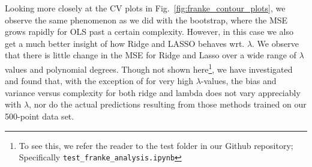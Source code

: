 \documentclass[reprint, english, nofootinbib]{revtex4-2}
\begin{document}
Looking more closely at the CV plots in Fig.~\ref{fig:franke_contour_plots}, we observe the same phenomenon as we did with the bootstrap, where the MSE grows rapidly for OLS past a certain complexity. However, in this case we also get a much better insight of how Ridge and LASSO behaves wrt. $\lambda$. We observe that there is little change in the MSE for Ridge and Lasso over a wide range of $\lambda$ values and polynomial degrees. Though not shown here\footnote{To see this, we refer the reader to the test folder in our Github repository; Specifically \lstinline{test_franke_analysis.ipynb}}, we have investigated and found that, with the exception of for very high $\lambda$-values, the bias and variance versus complexity for both ridge and lambda does not vary appreciably with $\lambda$, nor do the actual predictions resulting from those methods trained on our 500-point data set.



\end{document}
